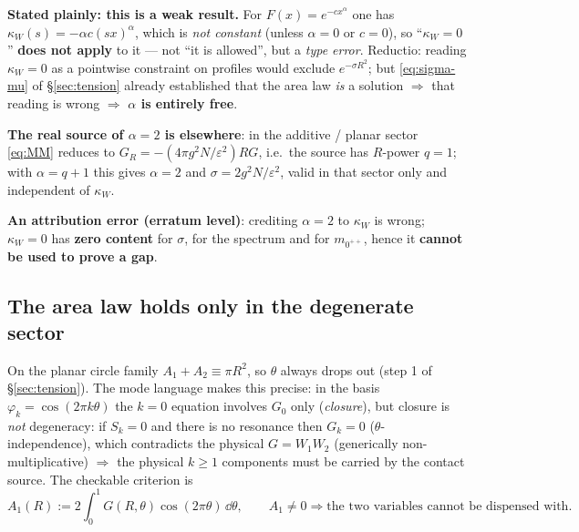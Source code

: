 \begin{keybox}
\textbf{Stated plainly: this is a weak result.} For $F(x)=e^{-cx^{\alpha}}$ one has
$\kappa_W(s)=-\alpha c(sx)^{\alpha}$, which is \emph{not constant} (unless $\alpha=0$ or $c=0$), so
``$\kappa_W=0$'' \textbf{does not apply} to it --- not ``it is allowed'', but a \emph{type error}.
Reductio: reading $\kappa_W=0$ as a pointwise constraint on profiles would exclude
$e^{-\sigma R^{2}}$; but \eqref{eq:sigma-mu} of \S\ref{sec:tension} already established that the area
law \emph{is} a solution $\Rightarrow$ that reading is wrong $\Rightarrow$ \textbf{$\alpha$ is entirely
free}. \LT
\end{keybox}

\noindent
\textbf{The real source of $\alpha=2$ is elsewhere}: in the additive / planar sector \eqref{eq:MM}
reduces to $G_R=-(4\pi g^{2}N/\varepsilon^{2})RG$, i.e.\ the source has $R$-power $q=1$; with
$\alpha=q+1$ this gives $\alpha=2$ and $\sigma=2g^{2}N/\varepsilon^{2}$, valid in that sector only and
independent of $\kappa_W$. \LT
{}

\noindent
\textbf{An attribution error (erratum level)}: crediting $\alpha=2$ to $\kappa_W$ is wrong;
$\kappa_W=0$ has \textbf{zero content} for $\sigma$, for the spectrum and for $m_{0^{++}}$, hence it
\textbf{cannot be used to prove a gap}. \LN
{}

\subsection{The area law holds only in the degenerate sector}

On the planar circle family $A_1+A_2\equiv\pi R^{2}$, so $\theta$ always drops out (step 1 of
\S\ref{sec:tension}). The mode language makes this precise: in the basis
$\varphi_k=\cos(2\pi k\theta)$ the $k=0$ equation involves $G_0$ only (\emph{closure}), but closure is
\emph{not} degeneracy: if $S_k=0$ and there is no resonance then $G_k=0$ ($\theta$-independence), which
contradicts the physical $G=W_1W_2$ (generically non-multiplicative) $\Rightarrow$ the physical $k\ge1$
components must be carried by the contact source. The checkable criterion is
\begin{equation}
  A_1(R):=2\int_0^{1}G(R,\theta)\cos(2\pi\theta)\,\dd\theta ,
  \qquad A_1\neq0 \Rightarrow \text{the two variables cannot be dispensed with}.
\end{equation}
\LT
{}

